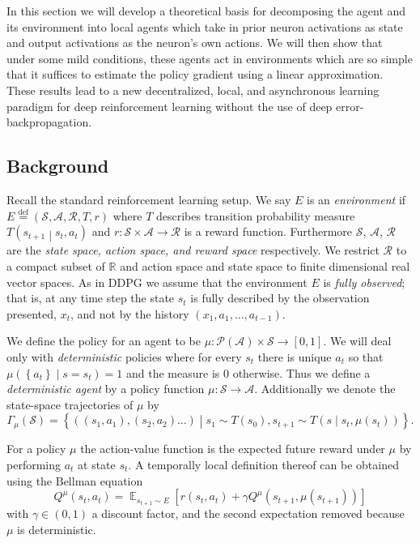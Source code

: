 \documentclass{article} %
\numberwithin{equation}{subsection}
\numberwithin{theorem}{subsection}
\def\expect{\mathop{{\mathbb{E}}}}
\newcommand{\set}[1]{ \left\{ #1 \right\} }
\def\suchthat{\mathrel{}\middle|\mathrel{}}
\def\defeq{\stackrel{\text{def}}{=}}
\theoremstyle{named}
\def\scripta{{\mathcal A}}
\def\scriptr{{\mathcal R}}
\def\scriptp{{\mathcal P}}
\def\scripts{{\mathcal S}}
\begin{document}
In this section we will develop a theoretical basis for decomposing the agent and its environment into local agents which take in prior neuron activations as state and output activations as the neuron's own actions. We will then show that under some mild conditions, these agents act in environments which are so simple that it suffices to estimate the policy gradient using a linear approximation. These results lead to a new decentralized, local, and asynchronous learning paradigm for deep reinforcement learning without the use of deep error-backpropagation.

\subsection{Background}
Recall the standard reinforcement learning setup. We say $E$ is an \emph{environment} if $E \defeq (\scripts, \scripta, \scriptr, T, r)$ where $T$ describes transition probability measure $T\left(s_{t+1}\suchthat s_t, a_t\right)$ and $r: \scripts \times \scripta \to \scriptr$ is a reward function. Furthermore $\scripts$, $\scripta$, $\scriptr$ are the \emph{state space, action space, and reward space} respectively. We restrict $\scriptr$ to a compact subset of $\mathbb{R}$ and action space and state space to finite dimensional real vector spaces. As in DDPG \cite{DBLP:journals/corr/LillicrapHPHETS15} we assume that the environment $E$ is \emph{fully observed}; that is, at any time step the state $s_t$ is fully described by the observation presented, $x_t$, and not by the history $(x_1, a_1, \dots, a_{t-1}).$

We define the policy for an agent to be $\mu: \scriptp(\scripta) \times \scripts \to [0,1]$. We will deal only with \emph{deterministic} policies where for every $s_t$ there is unique $a_t$ so that $\mu\left(\set{a_t} \suchthat s = s_t\right) = 1$ and the measure is $0$ otherwise. Thus we define a \emph{deterministic agent} by a policy function $\mu: \scripts \to \scripta$. Additionally we denote the state-space trajectories of $\mu $ by
\begin{equation}
 	\Gamma_\mu(\scripts) = \set{((s_1, a_1), (s_2, a_2) \dots)\suchthat s_1 \sim T(s_0), s_{t+1} \sim T\left(s \suchthat s_t, \mu(s_t)\right)}.
 \end{equation}

For a policy $\mu$  the action-value function is the expected future reward under $\mu$ by performing $a_t$ at state $s_t$. A temporally local definition thereof can be obtained using the Bellman equation
\begin{equation}
    Q^{\mu}(s_t, a_t) = \expect_{s_{t+1} \sim E}\left[r(s_{t}, a_t) + \gamma Q^{\mu}(s_{t+1}, \mu(s_{t+1}))\right]
\end{equation}
with $\gamma \in (0,1)$ a discount factor, and the second expectation removed because $\mu$ is deterministic.
\end{document}
